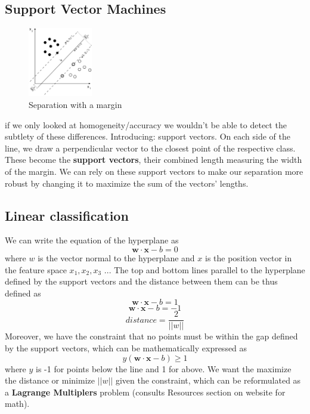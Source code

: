 \documentclass{article}
\let\vec\mathbf
\begin{document}
\subsection{Support Vector Machines}
\begin{figure}
  \begin{center}
    \vspace{-60pt}
    \includegraphics[width=0.25\textwidth]{separateMargin.png}
    \vspace{-30pt}
  \end{center}
  \caption{Separation with a margin}
  \vspace{-30pt}
\end{figure}
if we only looked at homogeneity/accuracy we wouldn't be able to detect the subtlety of these differences. Introducing: support vectors. On each side of the line, we draw a perpendicular vector to the closest point of the respective class. These become the \textbf{support vectors}, their combined length measuring the width of the margin. We can rely on these support vectors to make our separation more robust by changing it to maximize the sum of the vectors' lengths.

\subsection{Linear classification}
We can write the equation of the hyperplane as
$$ \vec{w} \cdot \vec{x} - b=0 $$
where $w$ is the vector normal to the hyperplane and $x$ is the position vector in the feature space $x_1, x_2, x_3$ ... The top and bottom lines parallel to the hyperplane defined by the support vectors and the distance between them can be thus defined as
$$ \vec{w} \cdot \vec{x} - b=1 $$
$$ \vec{w} \cdot \vec{x} - b=-1 $$
$$ distance = \frac{2}{||w||}$$
Moreover, we have the constraint that no points must be within the gap defined by the support vectors, which can be mathematically expressed as
$$ y(\vec{w} \cdot \vec{x} - b) \geq 1$$ 
where $y$ is -1 for points below the line and 1 for above. We want the maximize the distance or minimize $||w||$ given the constraint, which can be reformulated as a \textbf{Lagrange Multiplers} problem (consults Resources section on website for math).
\end{document}
